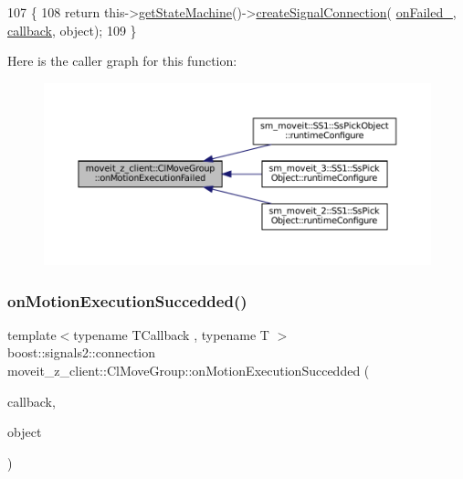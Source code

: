 \begin{DoxyCode}
107   \{
108     \textcolor{keywordflow}{return} this->\hyperlink{classsmacc_1_1ISmaccClient_aec51d4712404cb9882b86e4c854bb93a}{getStateMachine}()->\hyperlink{classsmacc_1_1ISmaccStateMachine_adf0f42ade0c65cc471960fe2a7c42da2}{createSignalConnection}(
      \hyperlink{classmoveit__z__client_1_1ClMoveGroup_ab9f19c609cfa111748bc16d497dffe9a}{onFailed\_}, \hyperlink{servers_2opencv__perception__node_2opencv__perception__node_8cpp_a050e697bd654facce10ea3f6549669b3}{callback}, \textcolor{keywordtype}{object});
109   \}
\end{DoxyCode}
Here is the caller graph for this function\+:
\nopagebreak
\begin{figure}[H]
\begin{center}
\leavevmode
\includegraphics[width=350pt]{classmoveit__z__client_1_1ClMoveGroup_a1a80f1f29d5be0ff115cbedb8c80afd8_icgraph}
\end{center}
\end{figure}
\mbox{\label{classmoveit__z__client_1_1ClMoveGroup_a4c3a7340e1e52015ccd61a94dba152c0}} 
\subsubsection{\texorpdfstring{on\+Motion\+Execution\+Succedded()}{onMotionExecutionSuccedded()}}
{\footnotesize\ttfamily template$<$typename T\+Callback , typename T $>$ \\
boost\+::signals2\+::connection moveit\+\_\+z\+\_\+client\+::\+Cl\+Move\+Group\+::on\+Motion\+Execution\+Succedded (\begin{DoxyParamCaption}\item[{T\+Callback}]{callback,  }\item[{T $\ast$}]{object }\end{DoxyParamCaption})\hspace{0.3cm}{\ttfamily [inline]}}



